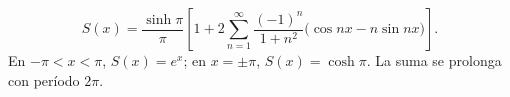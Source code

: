 \[S(x)=\frac{\sinh\pi}{\pi}\left[1+2\sum_{n=1}^{\infty}
\frac{(-1)^n}{1+n^2}\bigl(\cos nx-n\sin nx\bigr)\right].\]
En \(-\pi<x<\pi\), \(S(x)=e^x\); en \(x=\pm\pi\), \(S(x)=\cosh\pi\).
La suma se prolonga con período \(2\pi\).

